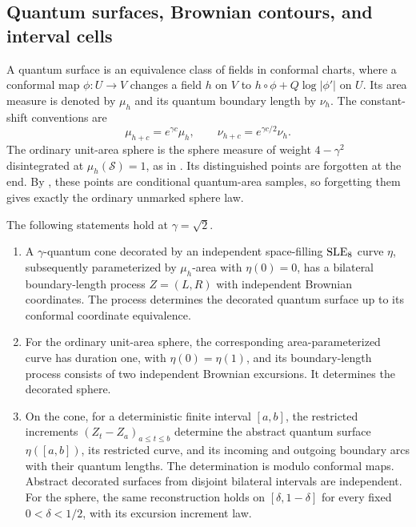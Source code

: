 \subsection{Quantum surfaces, Brownian contours, and interval cells}

A quantum surface is an equivalence class of fields in conformal
charts, where a conformal map $\phi:U\to V$ changes a field $h$
on $V$ to $h\circ\phi+Q\log|\phi'|$ on $U$. Its area measure
is denoted by $\mu_h$ and its quantum boundary length by $\nu_h$.
The constant-shift conventions are
\begin{equation}\label{tree:eq:measure_shift}
 \mu_{h+c}=e^{\gamma c}\mu_h,\qquad
 \nu_{h+c}=e^{\gamma c/2}\nu_h.
\end{equation}
The ordinary unit-area sphere is the sphere measure of weight
$4-\gamma^2$ disintegrated at $\mu_h(\mathcal S)=1$, as in
\cite[Definition~4.21(ii)]{DMS}. Its distinguished points are
forgotten at the end. By \cite[Proposition~A.13]{DMS}, these
points are conditional quantum-area samples, so forgetting them
gives exactly the ordinary unmarked sphere law.

\begin{theorem}
\label{tree:thm:background_peanosphere}
The following statements hold at $\gamma=\sqrt2$.
\begin{enumerate}
\item A $\gamma$-quantum cone decorated by an independent
space-filling $\mathrm{SLE}_8$ curve $\eta$, subsequently parameterized
by $\mu_h$-area with $\eta(0)=0$, has a bilateral boundary-length
process $Z=(L,R)$ with independent Brownian coordinates. The
process determines the decorated quantum surface up to its
conformal coordinate equivalence.
\item For the ordinary unit-area sphere, the corresponding
area-parameterized curve has duration one, with
$\eta(0)=\eta(1)$, and its boundary-length process consists of
two independent Brownian excursions. It determines the
decorated sphere.
\item On the cone, for a deterministic finite interval $[a,b]$, the restricted
increments $(Z_t-Z_a)_{a\leq t\leq b}$ determine the abstract
quantum surface $\eta([a,b])$, its restricted curve, and its
incoming and outgoing boundary arcs with their quantum lengths.
The determination is modulo conformal maps. Abstract decorated
surfaces from disjoint bilateral intervals are independent.
For the sphere, the same reconstruction holds on
$[\delta,1-\delta]$ for every fixed $0<\delta<1/2$, with its
excursion increment law.
\end{enumerate}
\end{theorem}

